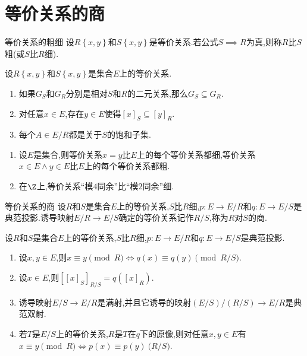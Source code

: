 \section{等价关系的商}

\begin{definition}{等价关系的粗细}{}
	设$R\left\{x,y\right\}$和$S\left\{x,y\right\}$是等价关系.若公式$S\implies R$为真,则称$R$比$S$粗(或$S$比$R$细).
\end{definition}

\begin{proposition}{}{}
	设$R\left\{x,y\right\}$和$S\left\{x,y\right\}$是集合$E$上的等价关系.
	\begin{enumerate}
		\item 如果$G_{S}$和$G_{R}$分别是相对$S$和$R$的二元关系,那么$G_{S}\subseteq G_{R}$.
		\item 对任意$x\in E$,存在$y\in E$使得$\left[x\right]_{S}\subseteq\left[y\right]_{R}$.
		\item 每个$A\in E/R$都是关于$S$的饱和子集.
	\end{enumerate}
\end{proposition}

\begin{example}{}{}
	\begin{enumerate}
		\item 设$E$是集合,则等价关系$x=y$比$E$上的每个等价关系都细,等价关系$x\in E\wedge y\in E$比$E$上的每个等价关系都粗.
		\item 在$\Z$上,等价关系``模$4$同余''比``模$2$同余''细.
	\end{enumerate}
\end{example}

\begin{definition}{等价关系的商}{}
	设$R$和$S$是集合$E$上的等价关系,$S$比$R$细,$p:E\to E/R$和$q:E\to E/S$是典范投影.诱导映射$E/R\to E/S$确定的等价关系记作$R/S$,称为$R$对$S$的商.
\end{definition}

\begin{proposition}{}{}
	设$R$和$S$是集合$E$上的等价关系,$S$比$R$细,$p:E\to E/R$和$q:E\to E/S$是典范投影.
	\begin{enumerate}
		\item 设$x,y\in E$,则$x\equiv y\pmod{R}\iff q\left(x\right)\equiv q\left(y\right)\pmod{R/S}$.
		\item 设$x\in E$,则$\left[\left[x\right]_{S}\right]_{R/S}=q\left(\left[x\right]_{R}\right)$.
		\item 诱导映射$E/S\to E/R$是满射,并且它诱导的映射$\left(E/S\right)/\left(R/S\right)\to E/R$是典范双射.
		\item 若$T$是$E/S$上的等价关系,$R$是$T$在$q$下的原像,则对任意$x,y\in E$有$x\equiv y\pmod{R}\iff p\left(x\right)\equiv p\left(y\right)\pod{R/S}$.
	\end{enumerate}
\end{proposition}


















